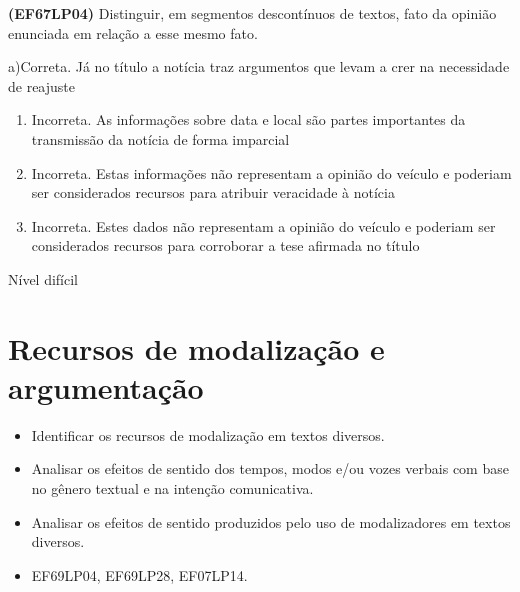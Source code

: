 {\textbf{(EF67LP04)} Distinguir, em segmentos descontínuos de textos,
fato da opinião enunciada em relação a esse mesmo fato.

a)Correta. Já no título a notícia traz argumentos que levam a crer na
necessidade de reajuste

\begin{enumerate}
\def\labelenumi{\arabic{enumi}.}
\item
  Incorreta. As informações sobre data e local são partes importantes da
  transmissão da notícia de forma imparcial
\item
  Incorreta. Estas informações não representam a opinião do veículo e
  poderiam ser considerados recursos para atribuir veracidade à notícia
\item
  Incorreta. Estes dados não representam a opinião do veículo e poderiam
  ser considerados recursos para corroborar a tese afirmada no título
\end{enumerate}

Nível difícil

\chapter{Recursos de modalização e argumentação}


\begin{itemize}

  \item Identificar os recursos de modalização em textos diversos.

  \item Analisar os efeitos de sentido dos tempos, modos e/ou vozes 
verbais com base no gênero textual e na intenção comunicativa.

  \item Analisar os efeitos de sentido produzidos pelo uso de modalizadores em textos diversos.

\end{itemize}


\begin{itemize}

  \item EF69LP04, EF69LP28, EF07LP14.

\end{itemize}

}
